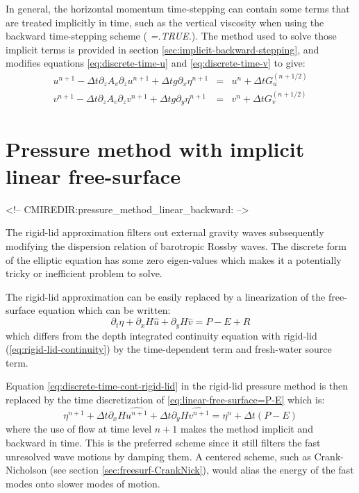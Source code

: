 In general, the horizontal momentum time-stepping can contain some terms 
that are treated implicitly in time,
such as the vertical viscosity when using the backward time-stepping scheme
( {\it =.TRUE.}).
The method used to solve those implicit terms is provided in 
section \ref{sec:implicit-backward-stepping}, and modifies
equations \ref{eq:discrete-time-u} and \ref{eq:discrete-time-v} to
give:
\begin{eqnarray}
u^{n+1} - \Delta t \partial_z A_v \partial_z u^{n+1}
+ \Delta t g \partial_x \eta^{n+1} & = & u^{n} + \Delta t G_u^{(n+1/2)}
\\
v^{n+1} - \Delta t \partial_z A_v \partial_z v^{n+1}
+ \Delta t g \partial_y \eta^{n+1} & = & v^{n} + \Delta t G_v^{(n+1/2)}
\end{eqnarray}


\section{Pressure method with implicit linear free-surface}
\label{sec:pressure-method-linear-backward}
\begin{rawhtml}
<!-- CMIREDIR:pressure_method_linear_backward: -->
\end{rawhtml}

The rigid-lid approximation filters out external gravity waves
subsequently modifying the dispersion relation of barotropic Rossby
waves. The discrete form of the elliptic equation has some zero
eigen-values which makes it a potentially tricky or inefficient
problem to solve.

The rigid-lid approximation can be easily replaced by a linearization
of the free-surface equation which can be written:
\begin{equation}
\partial_t \eta + \partial_x H \widehat{u} + \partial_y H \widehat{v} = P-E+R
\label{eq:linear-free-surface=P-E}
\end{equation}
which differs from the depth integrated continuity equation with
rigid-lid (\ref{eq:rigid-lid-continuity}) by the time-dependent term
and fresh-water source term.

Equation \ref{eq:discrete-time-cont-rigid-lid} in the rigid-lid
pressure method is then replaced by the time discretization of
\ref{eq:linear-free-surface=P-E} which is:
\begin{equation}
\eta^{n+1}
+ \Delta t \partial_x H \widehat{u^{n+1}}
+ \Delta t \partial_y H \widehat{v^{n+1}}
=
\eta^{n}
+ \Delta t ( P - E )
\label{eq:discrete-time-backward-free-surface}
\end{equation}
where the use of flow at time level $n+1$ makes the method implicit
and backward in time. This is the preferred scheme since it still
filters the fast unresolved wave motions by damping them. A centered
scheme, such as Crank-Nicholson (see section \ref{sec:freesurf-CrankNick}),
would alias the energy of the fast modes onto slower modes of motion.

